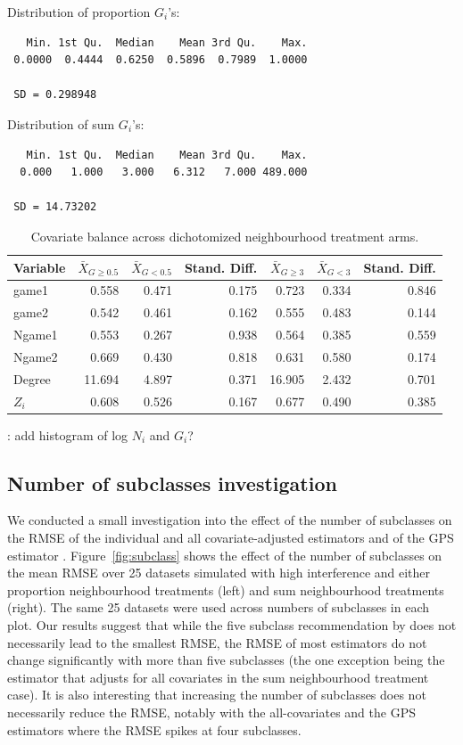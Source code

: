 \documentclass[10pt]{article}
\begin{document}
Distribution of proportion $G_i$'s:
\begin{verbatim}
   Min. 1st Qu.  Median    Mean 3rd Qu.    Max. 
 0.0000  0.4444  0.6250  0.5896  0.7989  1.0000
 
 SD = 0.298948
\end{verbatim}

Distribution of sum $G_i$'s:
\begin{verbatim}
   Min. 1st Qu.  Median    Mean 3rd Qu.    Max. 
  0.000   1.000   3.000   6.312   7.000 489.000 
  
 SD = 14.73202
\end{verbatim}

\begin{table}[H]
\centering
\begin{tabular}{@{}lrrrrrr@{}}
\toprule
Variable & $\bar{X}_{G\geq0.5}$ & $\bar{X}_{G<0.5}$ & Stand. Diff. & $\bar{X}_{G\geq3}$ & $\bar{X}_{G<3}$ & Stand. Diff. \\
\midrule
game1 & 0.558 & 0.471 & 0.175 & 0.723 & 0.334 & 0.846 \\
game2 & 0.542 & 0.461 & 0.162 & 0.555 & 0.483 & 0.144 \\
Ngame1 & 0.553 & 0.267 & 0.938 & 0.564 & 0.385 & 0.559 \\
Ngame2 & 0.669 & 0.430 & 0.818 & 0.631 & 0.580 & 0.174 \\
Degree & 11.694 & 4.897 & 0.371 & 16.905 & 2.432 & 0.701 \\
$Z_i$ & 0.608 & 0.526 & 0.167 & 0.677 & 0.490 & 0.385 \\
\bottomrule
\end{tabular}
\caption{Covariate balance across dichotomized neighbourhood treatment arms.}
\end{table}

\todo: add histogram of log $N_i$ and $G_i$?


\subsection{Number of subclasses investigation} \label{apx:subclass}

We conducted a small investigation into the effect of the number of subclasses on the RMSE of the individual and all covariate-adjusted estimators and of the GPS estimator \parencite{Forastiere:2021}. Figure~\ref{fig:subclass} shows the effect of the number of subclasses on the mean RMSE over 25 datasets simulated with high interference and either proportion neighbourhood treatments (left) and sum neighbourhood treatments (right). The same 25 datasets were used across numbers of subclasses in each plot. Our results suggest that while the five subclass recommendation by \textcite{Rosenbaum:1984} does not necessarily lead to the smallest RMSE, the RMSE of most estimators do not change significantly with more than five subclasses (the one exception being the estimator that adjusts for all covariates in the sum neighbourhood treatment case). It is also interesting that increasing the number of subclasses does not necessarily reduce the RMSE, notably with the all-covariates and the GPS estimators where the RMSE spikes at four subclasses.
\end{document}
